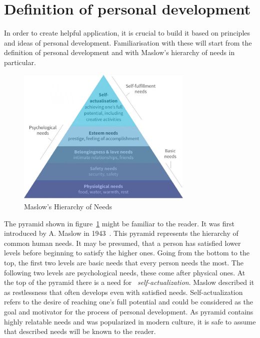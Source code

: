 
\section{Definition of personal development}\label{sec:definition-of-personal-development}

In order to create helpful application, it is crucial to build it based on principles and ideas of personal development.
Familiarisation with these will start from the definition of personal development and with Maslow's hierarchy of needs in particular.

\begin{figure}[h]
    \includegraphics[width=0.75\textwidth]{images/maslows.jpg}
    \caption{Maslow's Hierarchy of Needs ~\cite{maslow-pyramid}}
    \label{fig:maslow-pyramid}
\end{figure}

The pyramid shown in figure~\ref{fig:maslow-pyramid} might be familiar to the reader.
It was first introduced by A. Maslow in 1943~\cite{maslow-motivation}.
This pyramid represents the hierarchy of common human needs.
It may be presumed, that a person has satisfied lower levels before beginning to satisfy the higher ones.
Going from the bottom to the top, the first two levels are basic needs that every person needs the most.
The following two levels are psychological needs, these come after physical ones.
At the top of the pyramid there is a need for ~\textit{self-actualization}.
Maslow described it as restlessness that often develops even with satisfied needs.
Self-actualization refers to the desire of reaching one's full potential and could be considered as the goal and motivator for the process of personal development.
As pyramid contains highly relatable needs and was popularized in modern culture, it is safe to assume that described needs will be known to the reader.


